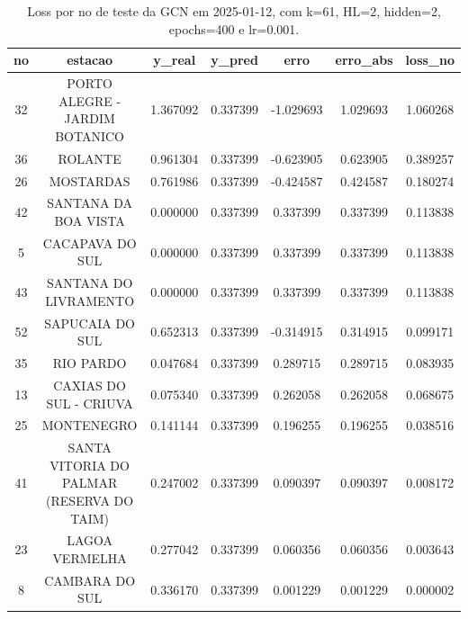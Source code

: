 \begin{table}[h]
\centering
\caption{Loss por no de teste da GCN em 2025-01-12, com k=61, HL=2, hidden=2, epochs=400 e lr=0.001.}
\label{tab:gcn_loss_k61_hl2_h2_e400_d20250112}
\begin{tabular}{ccccccc}
\toprule
no & estacao & y\_real & y\_pred & erro & erro\_abs & loss\_no \\
\midrule
32 & PORTO ALEGRE - JARDIM BOTANICO & 1.367092 & 0.337399 & -1.029693 & 1.029693 & 1.060268 \\
36 & ROLANTE & 0.961304 & 0.337399 & -0.623905 & 0.623905 & 0.389257 \\
26 & MOSTARDAS & 0.761986 & 0.337399 & -0.424587 & 0.424587 & 0.180274 \\
42 & SANTANA DA BOA VISTA & 0.000000 & 0.337399 & 0.337399 & 0.337399 & 0.113838 \\
5 & CACAPAVA DO SUL & 0.000000 & 0.337399 & 0.337399 & 0.337399 & 0.113838 \\
43 & SANTANA DO LIVRAMENTO & 0.000000 & 0.337399 & 0.337399 & 0.337399 & 0.113838 \\
52 & SAPUCAIA DO SUL & 0.652313 & 0.337399 & -0.314915 & 0.314915 & 0.099171 \\
35 & RIO PARDO & 0.047684 & 0.337399 & 0.289715 & 0.289715 & 0.083935 \\
13 & CAXIAS DO SUL - CRIUVA & 0.075340 & 0.337399 & 0.262058 & 0.262058 & 0.068675 \\
25 & MONTENEGRO & 0.141144 & 0.337399 & 0.196255 & 0.196255 & 0.038516 \\
41 & SANTA VITORIA DO PALMAR (RESERVA DO TAIM) & 0.247002 & 0.337399 & 0.090397 & 0.090397 & 0.008172 \\
23 & LAGOA VERMELHA & 0.277042 & 0.337399 & 0.060356 & 0.060356 & 0.003643 \\
8 & CAMBARA DO SUL & 0.336170 & 0.337399 & 0.001229 & 0.001229 & 0.000002 \\
\bottomrule
\end{tabular}
\end{table}
